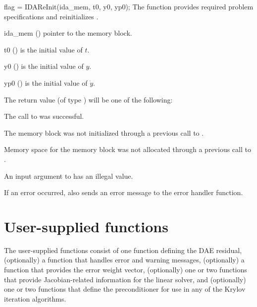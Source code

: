 {%
{
  flag = IDAReInit(ida\_mem, t0, y0, yp0);
}
{
  The function  provides required problem specifications
  and reinitializes {\idas}.
}
{
  \begin{args}
  \item[ida\_mem] ()
    pointer to the {\idas} memory block.
  \item[t0] ()
    is the initial value of $t$.
  \item[y0] ()
    is the initial value of $y$.
  \item[yp0] ()
    is the initial value of $\dot{y}$.
  \end{args}
}
{
  The return value  (of type ) will be one of the following:
  \begin{args}
  \item[\Id{IDA\_SUCCESS}]
    The call to  was successful.
  \item[\Id{IDA\_MEM\_NULL}]
    The {\idas} memory block was not initialized through a
    previous call to .
  \item[\Id{IDA\_NO\_MALLOC}]
    Memory space for the {\idas} memory block was not allocated through a
    previous call to .
  \item[\Id{IDA\_ILL\_INPUT}]
    An input argument to  has an illegal value.
  \end{args}
}
{
  If an error occurred,  also sends an error message to the
  error handler function.
}


\section{User-supplied functions}\label{ss:user_fct_sim}

The user-supplied functions consist of one function defining the DAE residual,
(optionally) a function that handles error and warning messages,
(optionally) a function that provides the error weight vector,
(optionally) one or two functions that provide Jacobian-related information for the linear
solver, and (optionally) one or two functions
that define the preconditioner for use in any of the Krylov iteration algorithms.
}
